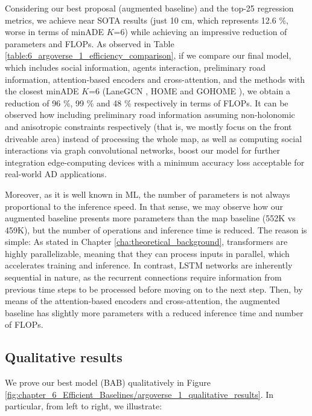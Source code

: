 Considering our best proposal (augmented baseline) and the top-25 regression metrics, we achieve near \ac{SOTA} results (just 10 cm, which represents 12.6 \%, worse in terms of \ac{minADE} $K$=6) while achieving an impressive reduction of parameters and \acp{FLOP}. As observed in Table \ref{table:6_argoverse_1_efficiency_comparison}, if we compare our final model, which includes social information, agents interaction, preliminary road information, attention-based encoders and cross-attention, and the methods with the closest \ac{minADE} $K$=6 (LaneGCN \cite{liang2020learning}, HOME \cite{gilles2021home} and GOHOME \cite{gilles2022gohome}), we obtain a reduction of 96 \%, 99 \% and 48 \% respectively in terms of \acp{FLOP}. It can be observed how including preliminary road information assuming non-holonomic \cite{triggs1993motion} and anisotropic \cite{ross1989planning} constraints respectively (that is, we mostly focus on the front driveable area) instead of processing the whole map, as well as computing social interactions via graph convolutional networks, boost our model for further integration edge-computing devices with a minimum accuracy loss acceptable for real-world \ac{AD} applications. 

Moreover, as it is well known in \ac{ML}, the number of parameters is not always proportional to the inference speed. In that sense, we may observe how our augmented baseline presents more parameters than the map baseline (552K vs 459K), but the number of operations and inference time is reduced. The reason is simple: As stated in Chapter \ref{cha:theoretical_background}, transformers are highly parallelizable, meaning that they can process inputs in parallel, which accelerates training and inference. In contrast, \ac{LSTM} networks are inherently sequential in nature, as the recurrent connections require information from previous time steps to be processed before moving on to the next step. Then, by means of the attention-based encoders and cross-attention, the augmented baseline has slightly more parameters with a reduced inference time and number of \acp{FLOP}.

\subsection{Qualitative results}
\label{subsec:6_efficient_baselines_qualitative_results}

We prove our best model (\ac{BAB}) qualitatively in Figure \ref{fig:chapter_6_Efficient_Baselines/argoverse_1_qualitative_results}. In particular, from left to right, we illustrate:

